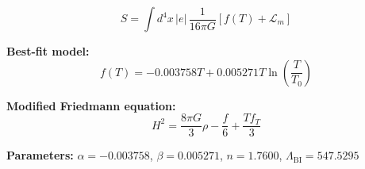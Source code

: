 
\begin{equation}
  S = \int d^4x \, |e| \, \frac{1}{16\pi G} \left[ f(T) + \mathcal{L}_m \right]
\end{equation}

\textbf{Best-fit model:}
\begin{equation}
  f(T) = -0.003758 T + 0.005271 T \ln\!\left(\frac{T}{T_0}\right)
\end{equation}

\textbf{Modified Friedmann equation:}
\begin{equation}
  H^2 = \frac{8\pi G}{3} \rho - \frac{f}{6} + \frac{T f_T}{3}
\end{equation}

\textbf{Parameters:}
$\alpha = -0.003758$, \quad
$\beta = 0.005271$, \quad
$n = 1.7600$, \quad
$\Lambda_{\text{BI}} = 547.5295$